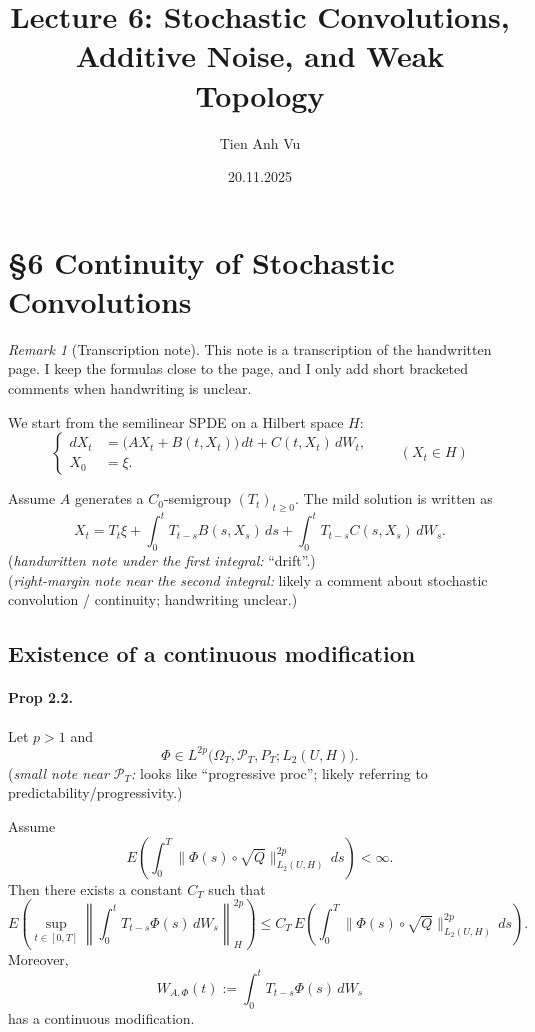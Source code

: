 \documentclass[11pt]{article}
\title{Lecture 6: Stochastic Convolutions, Additive Noise, and Weak Topology}
\date{20.11.2025}
\author{Tien Anh Vu}
\theoremstyle{definition}
\theoremstyle{remark}
\newtheorem{remark}{Remark}
\begin{document}
\maketitle

\section*{\S 6 Continuity of Stochastic Convolutions}

\begin{remark}[Transcription note]
This note is a transcription of the handwritten page. I keep the formulas close to the page, and I only add short bracketed comments when handwriting is unclear.
\end{remark}

We start from the semilinear SPDE on a Hilbert space $H$:
\[
\left\{
\begin{aligned}
dX_t &= \bigl(AX_t + B(t,X_t)\bigr)\,dt + C(t,X_t)\,dW_t,\\
X_0 &= \xi.
\end{aligned}
\right.
\qquad (X_t \in H)
\]

Assume $A$ generates a $C_0$-semigroup $(T_t)_{t\ge 0}$. The mild solution is written as
\[
X_t
=
T_t \xi
+ \int_0^t T_{t-s} B(s,X_s)\,ds
+ \int_0^t T_{t-s} C(s,X_s)\,dW_s.
\]
\noindent
(\emph{handwritten note under the first integral:} ``drift''.)\\
(\emph{right-margin note near the second integral:} likely a comment about stochastic convolution / continuity; handwriting unclear.)

\subsection*{Existence of a continuous modification}

\paragraph{Prop 2.2.}
Let $p>1$ and
\[
\Phi \in L^{2p}\!\bigl(\Omega_T,\mathcal{P}_T,P_T;L_2(U,H)\bigr).
\]
\noindent
(\emph{small note near $\mathcal{P}_T$:} looks like ``progressive proc''; likely referring to predictability/progressivity.)

Assume
\[
E\!\left(
\int_0^T \|\Phi(s)\circ \sqrt{Q}\|_{L_2(U,H)}^{2p}\,ds
\right)
< \infty.
\]
Then there exists a constant $C_T$ such that
\[
E\!\left(
\sup_{t\in[0,T]}
\left\|
\int_0^t T_{t-s}\Phi(s)\,dW_s
\right\|_H^{2p}
\right)
\le
C_T\,E\!\left(
\int_0^T
\|\Phi(s)\circ \sqrt{Q}\|_{L_2(U,H)}^{2p}\,ds
\right).
\]
Moreover,
\[
W_{A,\Phi}(t)
:=
\int_0^t T_{t-s}\Phi(s)\,dW_s
\]
has a continuous modification.
\end{document}
